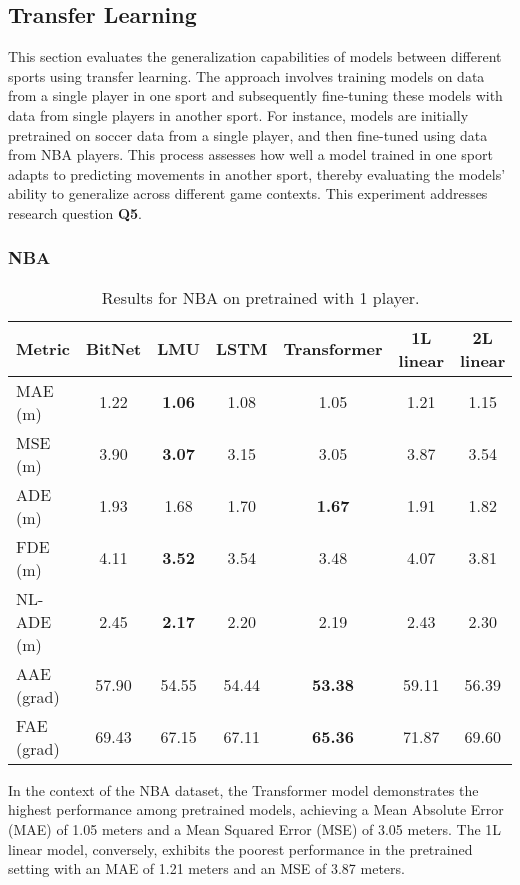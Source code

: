 \subsection{Transfer Learning}
\label{exp:transf}
This section evaluates the generalization capabilities of models between different sports using transfer learning. The approach involves training models on data from a single player in one sport and subsequently fine-tuning these models with data from single players in another sport. For instance, models are initially pretrained on soccer data from a single player, and then fine-tuned using data from NBA players. This process assesses how well a model trained in one sport adapts to predicting movements in another sport, thereby evaluating the models' ability to generalize across different game contexts. This experiment addresses research question \textbf{Q5}.

\subsubsection{NBA}

\begin{table}[H]
\centering
\caption{Results for NBA on pretrained with 1 player.}
\label{pre:NBA}
\begin{tabular}{l||c|c|c|c|c|c}
Metric & BitNet & LMU & LSTM & Transformer & 1L linear & 2L linear \\
\hline\hline
MAE (m) & 1.22 & \textbf{1.06} & 1.08 & 1.05 & 1.21 & 1.15 \\
MSE (m) & 3.90 & \textbf{3.07} & 3.15 & 3.05 & 3.87 & 3.54 \\
ADE (m) & 1.93 & 1.68 & 1.70 & \textbf{1.67} & 1.91 & 1.82 \\
FDE (m) & 4.11 & \textbf{3.52} & 3.54 & 3.48 & 4.07 & 3.81 \\
NL-ADE (m) & 2.45 & \textbf{2.17} & 2.20 & 2.19 & 2.43 & 2.30 \\
AAE (grad) & 57.90 & 54.55 & 54.44 & \textbf{53.38} & 59.11 & 56.39 \\
FAE (grad) & 69.43 & 67.15 & 67.11 & \textbf{65.36} & 71.87 & 69.60 \\
\end{tabular}
\end{table}

In the context of the NBA dataset, the Transformer model demonstrates the highest performance among pretrained models, achieving a Mean Absolute Error (MAE) of 1.05 meters and a Mean Squared Error (MSE) of 3.05 meters. The 1L linear model, conversely, exhibits the poorest performance in the pretrained setting with an MAE of 1.21 meters and an MSE of 3.87 meters.

